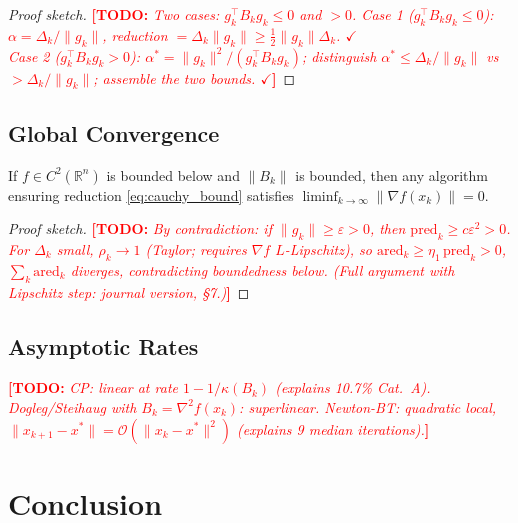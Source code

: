 \documentclass[11pt,a4paper]{article}
\newcommand{\TODO}[1]{\textcolor{red}{\textbf{[TODO:} \textit{#1}\textbf{]}}}
\newcommand{\R}{\mathbb{R}}
\newcommand{\norm}[1]{\lVert#1\rVert}
\newcommand{\gk}{g_k}
\newcommand{\Bk}{B_k}
\newcommand{\xk}{x_k}
\newcommand{\dk}{\Delta_k}
\begin{document}
\begin{proof}[Proof sketch]
\TODO{Two cases: $\gk^\top\Bk\gk \le 0$ and $> 0$.
Case 1 ($\gk^\top\Bk\gk \le 0$): $\alpha = \dk/\norm{\gk}$,
reduction $= \dk\norm{\gk} \ge \tfrac{1}{2}\norm{\gk}\dk$. $\checkmark$\\
Case 2 ($\gk^\top\Bk\gk > 0$): $\alpha^* = \norm{\gk}^2/(\gk^\top\Bk\gk)$;
distinguish $\alpha^* \le \dk/\norm{\gk}$ vs $> \dk/\norm{\gk}$;
assemble the two bounds. $\checkmark$}
\end{proof}

\subsection{Global Convergence}

\begin{theorem}
If $f \in C^2(\R^n)$ is bounded below and $\norm{\Bk}$ is bounded, then any
algorithm ensuring reduction \eqref{eq:cauchy_bound} satisfies
$\liminf_{k\to\infty} \norm{\nabla f(\xk)} = 0$.
\end{theorem}

\begin{proof}[Proof sketch]
\TODO{By contradiction: if $\norm{\gk} \ge \varepsilon > 0$, then
$\mathrm{pred}_k \ge c\varepsilon^2 > 0$.
For $\dk$ small, $\rho_k \to 1$ (Taylor; requires $\nabla f$
$L$-Lipschitz), so $\mathrm{ared}_k \ge \eta_1\,\mathrm{pred}_k > 0$,
$\sum_k \mathrm{ared}_k$ diverges, contradicting boundedness below.
(Full argument with Lipschitz step: journal version, §7.)}
\end{proof}

\subsection{Asymptotic Rates}

\TODO{CP: linear at rate $1-1/\kappa(\Bk)$ (explains 10.7\% Cat.~A).
Dogleg/Steihaug with $\Bk = \nabla^2 f(\xk)$: superlinear.
Newton-BT: quadratic local, $\norm{x_{k+1}-x^*} = \mathcal{O}(\norm{x_k-x^*}^2)$
(explains 9 median iterations).}

\section{Conclusion}
\label{sec:conclusion}
\end{document}
